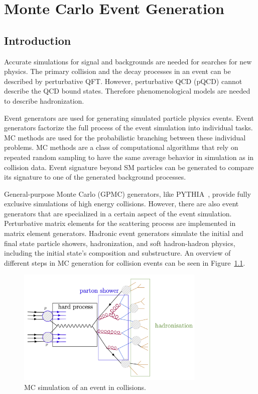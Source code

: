 %
%

\chapter{Monte Carlo Event Generation}
\label{event_sim}

\section{Introduction}

Accurate simulations for signal and backgrounds are needed for searches for new physics. The primary collision and the decay processes in an event can be described by perturbative QFT. However, perturbative QCD (pQCD) cannot describe the QCD bound states. Therefore phenomenological models are needed to describe hadronization.

Event generators are used for generating simulated particle physics events. Event generators factorize the full process of the event simulation into individual tasks. MC methods are used for the probabilistic branching between these individual problems. MC methods are a class of computational algorithms that rely on repeated random sampling to have the same average behavior in simulation as in collision data. Event signature beyond SM particles can be generated to compare its signature to one of the generated background processes.

General-purpose Monte Carlo (GPMC) generators, like PYTHIA~\cite{Sjostrand:2014zea}, provide fully exclusive simulations of high energy collisions. However, there are also event generators that are specialized in a certain aspect of the event simulation. Perturbative matrix elements for the scattering process are implemented in matrix element generators. Hadronic event generators simulate the initial and final state particle showers, hadronization, and soft hadron-hadron physics, including the initial state's composition and substructure. An overview of different steps in MC generation for \pp collision events can be seen in Figure~\ref{fig:simulation}.

\begin{figure}[htbp]
  \centering
  \includegraphics[width=0.8\textwidth]{plots/chapter4/simulation.png}
  \caption{MC simulation of an event in \pp collisions.}
  \label{fig:simulation}
\end{figure}



